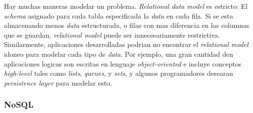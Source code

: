 Hay muchas maneras modelar un problema. \textit{Relational data model} es estricto: El \textit{schema} asignado para cada tabla especificada la \textit{data} en cada fila. Si se esta almacenando menos \textit{data} estructurada, o filas con mas diferencia en las columnas que se guardan, \textit{relational model} puede ser innecesariamente restrictiva. Similarmente, aplicaciones desarrolladas podrian no encontrar el \textit{relational model} idoneo para modelar cada tipo de \textit{data}. Por ejemplo, una gran cantidad den aplicaciones logicas son escritas en lenguaje \textit{object-oriented} e incluye conceptos \textit{high-level} tales como \textit{lists}, \textit{queues}, y \textit{sets}, y algunos programadores desearan \textit{persistence layer} para modelar esto.



\subsubsection{NoSQL}

